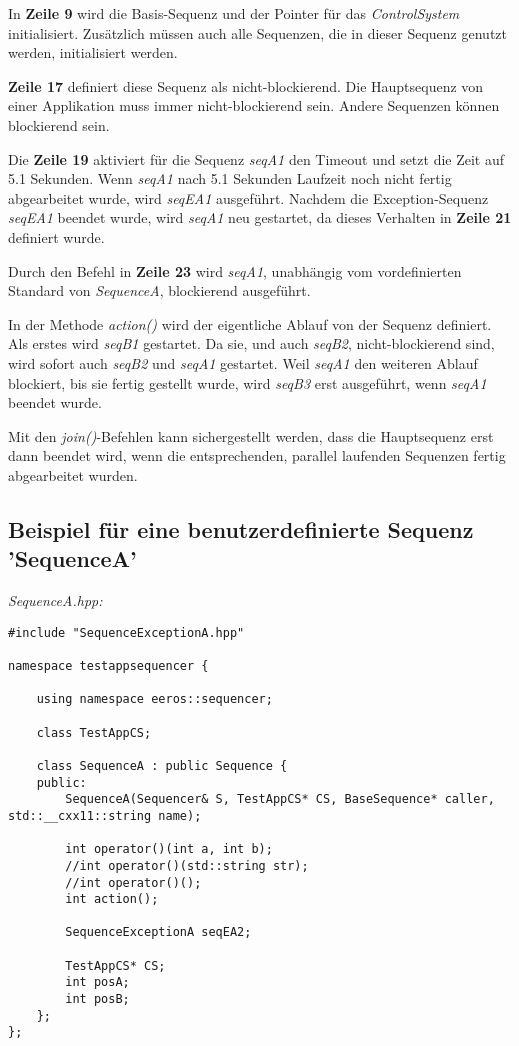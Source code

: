In \textbf{Zeile 9} wird die Basis-Sequenz und der Pointer für das \textit{ControlSystem} initialisiert.
Zusätzlich müssen auch alle Sequenzen, die in dieser Sequenz genutzt werden, initialisiert werden.

\textbf{Zeile 17} definiert diese Sequenz als nicht-blockierend.
Die Hauptsequenz von einer Applikation muss immer nicht-blockierend sein.
Andere Sequenzen können blockierend sein.

Die \textbf{Zeile 19} aktiviert für die Sequenz \textit{seqA1} den Timeout und setzt die Zeit auf 5.1 Sekunden.
Wenn \textit{seqA1} nach 5.1 Sekunden Laufzeit noch nicht fertig abgearbeitet wurde, wird \textit{seqEA1} ausgeführt.
Nachdem die Exception-Sequenz \textit{seqEA1} beendet wurde, wird \textit{seqA1} neu gestartet, da dieses Verhalten in \textbf{Zeile 21} definiert wurde.

Durch den Befehl in \textbf{Zeile 23} wird \textit{seqA1}, unabhängig vom vordefinierten Standard von \textit{SequenceA}, blockierend ausgeführt.

In der Methode \textit{action()} wird der eigentliche Ablauf von der Sequenz definiert.
Als erstes wird \textit{seqB1} gestartet.
Da sie, und auch \textit{seqB2}, nicht-blockierend sind, wird sofort auch \textit{seqB2} und \textit{seqA1} gestartet.
Weil \textit{seqA1} den weiteren Ablauf blockiert, bis sie fertig gestellt wurde, wird \textit{seqB3} erst ausgeführt, wenn \textit{seqA1} beendet wurde.

Mit den \textit{join()}-Befehlen kann sichergestellt werden, dass die Hauptsequenz erst dann beendet wird, wenn die entsprechenden, parallel laufenden Sequenzen fertig abgearbeitet wurden.


\subsection{Beispiel für eine benutzerdefinierte Sequenz 'SequenceA'}

\textit{SequenceA.hpp:}\
\begin{lstlisting}
#include "SequenceExceptionA.hpp"

namespace testappsequencer {
	
	using namespace eeros::sequencer;
	
	class TestAppCS;
	
	class SequenceA : public Sequence {
	public:
		SequenceA(Sequencer& S, TestAppCS* CS, BaseSequence* caller, std::__cxx11::string name);
		
		int operator()(int a, int b);
		//int operator()(std::string str);
		//int operator()();
		int action();
		
		SequenceExceptionA seqEA2;
		
		TestAppCS* CS;
		int posA;
		int posB;
	};
};
\end{lstlisting}

